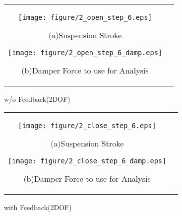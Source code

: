 \documentclass[a4paper,12pt]{article_vdlab_sotsuron}
\begin{document}
\newpage
\begin{figure}[htp]
  \begin{tabular}{cc}
  \begin{minipage}{0.5\hsize}
  \begin{center} 
    \texttt{[image: figure/2\_open\_step\_6.eps]}
    \end{center}
    \begin{center}
    \vspace*{3mm}
    \ (a)Suspension Stroke\
    \end{center}
  \end{minipage}
  \begin{minipage}{0.5\hsize}
     \begin{center}
      \texttt{[image: figure/2\_open\_step\_6\_damp.eps]}
      \end{center}
      \begin{center}
      \vspace*{3mm}
      \ (b)Damper Force to use for Analysis\
    \end{center}
  \end{minipage}
  \end{tabular}
  \vspace*{3mm}
  \caption{w/o Feedback(2DOF)}
    \label{fig:2_wo_feedback}
\end{figure}

\vspace*{10mm}
\begin{figure}[htp]
  \begin{tabular}{cc}
  \begin{minipage}{0.5\hsize}
  \begin{center} 
    \texttt{[image: figure/2\_close\_step\_6.eps]}
    \end{center}
    \begin{center}
    \vspace*{3mm}
    \ (a)Suspension Stroke\
    \end{center}
  \end{minipage}
  \begin{minipage}{0.5\hsize}
     \begin{center}
      \texttt{[image: figure/2\_close\_step\_6\_damp.eps]}
      \end{center}
      \begin{center}
      \vspace*{3mm}
      \ (b)Damper Force to use for Analysis\
    \end{center}
  \end{minipage}
  \end{tabular}
  \vspace*{3mm}
  \caption{with Feedback(2DOF)}
    \label{fig:2_with_feedback}
\end{figure}
\end{document}
